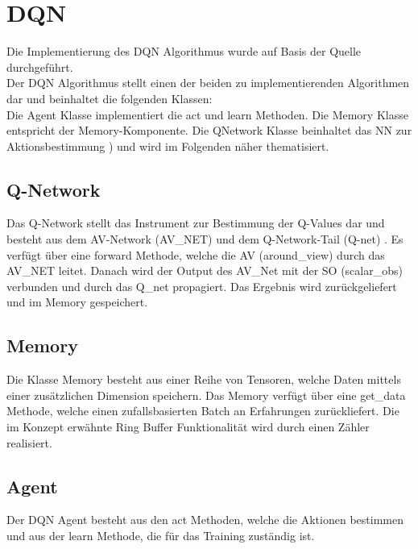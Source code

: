 \section{DQN} \label{sec:Implementierung_DQN}
Die Implementierung des DQN Algorithmus wurde auf Basis der Quelle \cite{Charles2013} durchgeführt.\\
Der DQN Algorithmus stellt einen der beiden zu implementierenden Algorithmen dar und beinhaltet die folgenden Klassen:\\
Die Agent Klasse implementiert die act  und learn  Methoden.
Die Memory Klasse entspricht der Memory-Komponente. Die QNetwork Klasse beinhaltet das NN zur Aktionsbestimmung ) und wird im Folgenden näher thematisiert.

\subsection{Q-Network} \label{subsec:Implementierung_Q-Network}
Das Q-Network stellt das Instrument zur Bestimmung der Q-Values dar und besteht aus dem AV-Network (AV\_NET) und dem Q-Network-Tail (Q-net) . Es verfügt über eine
forward Methode, welche die AV (around\_view) durch das AV\_NET leitet. Danach wird der Output des AV\_Net mit der SO (scalar\_obs) verbunden und durch das Q\_net propagiert. Das Ergebnis wird zurückgeliefert und im Memory gespeichert. 

\subsection{Memory} \label{subsec:Implementierung_Memory_DQN}
Die Klasse Memory besteht aus einer Reihe von Tensoren, welche Daten mittels einer zusätzlichen Dimension speichern.
Das Memory verfügt über eine get\_data Methode, welche einen zufallsbasierten Batch an Erfahrungen zurückliefert. Die im Konzept erwähnte Ring Buffer Funktionalität wird durch einen Zähler realisiert. 

\subsection{Agent} \label{subsec:Implementierung_DQN_Agent}
Der DQN Agent besteht aus den act Methoden, welche die Aktionen bestimmen und aus der learn Methode, die für das Training zuständig ist.

